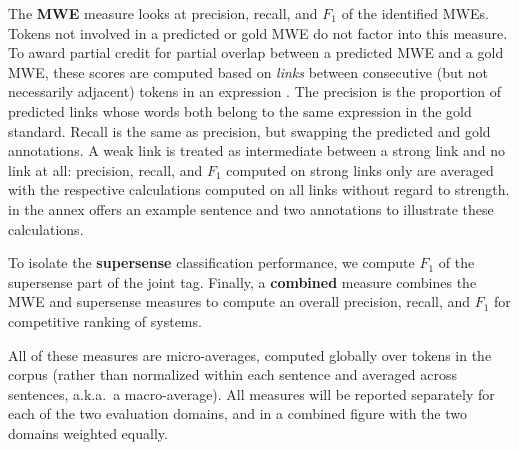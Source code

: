 \documentclass[11pt]{article}
\newcommand{\ensuretext}[1]{#1}
\newcommand{\nssmarker}{\ensuretext{\textcolor{magenta}{\ensuremath{^{\textsc{NS}}_{\textsc{S}}}}}}
\newcommand{\arkcomment}[3]{\ensuretext{\textcolor{#3}{[#1 #2]}}}
\newcommand{\nss}[1]{\arkcomment{\nssmarker}{#1}{magenta}}
\newcommand{\longversion}[1]{} %
\begin{document}
The \textbf{MWE} measure looks at precision, recall, and $F_1$ 
of the identified MWEs. Tokens not involved in a predicted or gold MWE
do not factor into this measure. 
To award partial credit for partial overlap between a predicted MWE 
and a gold MWE, these scores are computed based on \emph{links} between 
consecutive (but not necessarily adjacent) tokens in an expression \citep{schneider-14}.
The precision is the proportion of predicted links whose words 
both belong to the same expression in the gold standard. 
Recall is the same as precision, but swapping the predicted and gold annotations.\longversion{\footnote{This computation on the basis of links 
is a slight simplification of the MUC coreference measure \citep{vilain-95}.}}
A weak link is treated as intermediate between a strong link and no link at all: 
precision, recall, and $F_1$ computed on strong links only are averaged 
with the respective calculations computed on all links without regard to strength. 
 in the annex offers an example sentence and two annotations 
to illustrate these calculations.

To isolate the \textbf{supersense} classification performance, 
we compute $F_1$ of the supersense part of the joint tag.\longversion{
Because the supersense of a strong MWE is marked on its first word, 
this will have the effect of penalizing errors on the left boundary of an MWE, 
but it is less sensitive to the MWE analysis than the link-based measure. 

The third measure is a hybrid of the first two: it computes \textbf{overall} performance 
in terms of link-based $F_1$, where for each supersense label, 
a self-link encoding that label is added to the first word of the expression.
Credit is only given for a self-link if in the other analysis, 
a corresponding self-link occurs with the same supersense.\nss{short:}}
Finally, a \textbf{combined} measure combines the MWE and supersense measures 
to compute an overall precision, recall, and $F_1$
for competitive ranking of systems.

All of these measures are micro-averages, computed globally over tokens in the corpus 
(rather than normalized within each sentence and averaged across sentences, a.k.a.~a macro-average).
All measures will be reported separately for each of the two evaluation domains, 
and in a combined figure with the two domains weighted equally. 

\end{document}
